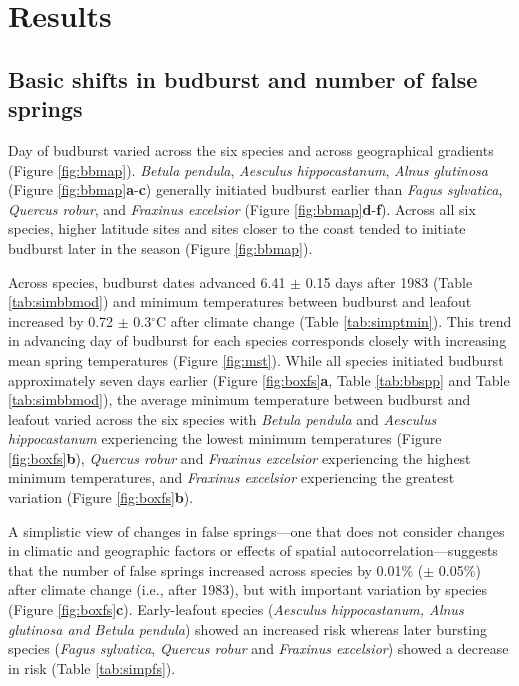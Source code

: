 \documentclass{article}\usepackage[]{graphicx}\usepackage[]{color}
\begin{document}
\section*{Results} %
\subsection*{Basic shifts in budburst and number of false springs}
Day of budburst varied across the six species and across geographical gradients (Figure \ref{fig:bbmap}). \textit{Betula pendula}, \textit{Aesculus hippocastanum}, \textit{Alnus glutinosa} (Figure \ref{fig:bbmap}\textbf{a}-\textbf{c}) generally initiated budburst earlier than \textit{Fagus sylvatica}, \textit{Quercus robur}, and \textit{Fraxinus excelsior} (Figure \ref{fig:bbmap}\textbf{d}-\textbf{f}). Across all six species, higher latitude sites and sites closer to the coast tended to initiate budburst later in the season (Figure \ref{fig:bbmap}).  

Across species, budburst dates advanced 6.41 $\pm$ 0.15 days after 1983 (Table \ref{tab:simbbmod}) and minimum temperatures between budburst and leafout increased by 0.72 $\pm$ 0.3$^{\circ}$C after climate change (Table \ref{tab:simptmin}). This trend in advancing day of budburst for each species corresponds closely with increasing mean spring temperatures (Figure \ref{fig:mst}). While all species initiated budburst approximately seven days earlier (Figure \ref{fig:boxfs}\textbf{a}, Table \ref{tab:bbspp} and Table \ref{tab:simbbmod}), the average minimum temperature between budburst and leafout varied across the six species with \textit{Betula pendula} and \textit{Aesculus hippocastanum} experiencing the lowest minimum temperatures (Figure \ref{fig:boxfs}\textbf{b}), \textit{Quercus robur} and \textit{Fraxinus excelsior} experiencing the highest minimum temperatures, and \textit{Fraxinus excelsior} experiencing the greatest variation (Figure \ref{fig:boxfs}\textbf{b}). 

A simplistic view of changes in false springs---one that does not consider changes in climatic and geographic factors or effects of spatial autocorrelation---suggests that the number of false springs increased across species by 0.01\% ($\pm$ 0.05\%) after climate change (i.e., after 1983), but with important variation by species (Figure \ref{fig:boxfs}\textbf{c}). Early-leafout species (\textit{Aesculus hippocastanum, \textit{Alnus glutinosa} and \textit{Betula pendula}}) showed an increased risk whereas later bursting species (\textit{Fagus sylvatica}, \textit{Quercus robur} and \textit{Fraxinus excelsior}) showed a decrease in risk (Table \ref{tab:simpfs}). 
\end{document}

